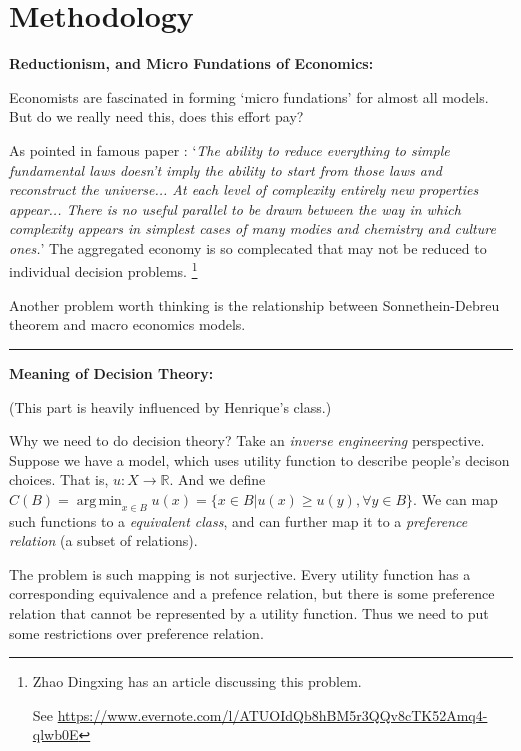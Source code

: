 \documentclass{book}
\theoremstyle{plain}
\theoremstyle{definition}
\newcommand{\R}{\mathbb{R}}			%
\DeclareMathOperator*{\argmin}{arg\,min}
\begin{document}





\chapter{Methodology} %
\label{cha:methodology}

\noindent
\textbf{Reductionism, and Micro Fundations of Economics:}

Economists are fascinated in forming `micro fundations' for almost all models. But do we really need this, does this effort pay? 

As pointed in famous paper \cite{anderson1972:science}: `\textit{The ability to reduce everything to simple fundamental laws doesn't imply the ability to start from those laws and reconstruct the universe... At each level of complexity entirely new properties appear... There is no useful parallel to be drawn between the way in which complexity appears in simplest cases of many modies and chemistry and culture ones.}'
The aggregated economy is so complecated that may not be reduced to individual decision problems.
\footnote{Zhao Dingxing has an article discussing this problem.

See \url{https://www.evernote.com/l/ATUOIdQb8hBM5r3QQv8cTK52Amq4-qlwb0E}}

Another problem worth thinking is the relationship between Sonnethein-Debreu theorem and macro economics models.

\vspace{3mm}
\hrule
\vspace{3mm}

\vspace{3mm}
\noindent
\textbf{Meaning of Decision Theory:}

(This part is heavily influenced by Henrique's class.)

Why we need to do decision theory?
Take an \textit{inverse engineering} perspective.
Suppose we have a model, which uses utility function to describe people's decison choices. 
That is, $u:X \rightarrow \R$.
And we define $C(B)=\argmin_{x\in B} u(x)=
\{x\in B | u(x)\geq u(y),\forall y\in B\}$.
We can map such functions to a \textit{equivalent class}, and can further map it to a \textit{preference relation} (a subset of relations).

The problem is such mapping is not surjective.
Every utility function has a corresponding equivalence and a prefence relation,
but there is some preference relation that cannot be represented by a utility function.
Thus we need to put some restrictions over preference relation.
\end{document}
